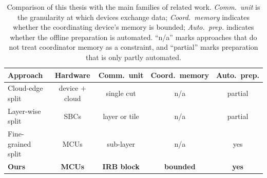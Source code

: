 \begin{table}[t]
\centering
\caption{Comparison of this thesis with the main families of related work.
\emph{Comm.\ unit} is the granularity at which devices exchange data;
\emph{Coord.\ memory} indicates whether the coordinating device's memory is bounded;
\emph{Auto.\ prep.} indicates whether the offline preparation is automated.
``n/a'' marks approaches that do not treat coordinator memory as a constraint, and ``partial'' marks preparation that is only partly automated.}
\label{tab:rw-positioning}
\footnotesize
\setlength{\tabcolsep}{5pt}
\begin{tabular}{l c c c c}
\hline
\textbf{Approach} & \textbf{Hardware} & \textbf{Comm.\ unit}
 & \textbf{Coord.\ memory} & \textbf{Auto.\ prep.} \\
\hline
Cloud-edge split & device $+$ cloud & single cut & n/a & partial \\
Layer-wise split & SBCs & layer or tile & n/a & partial \\
Fine-grained split & MCUs & sub-layer & n/a & yes \\
\textbf{Ours} & \textbf{MCUs} & \textbf{IRB block} & \textbf{bounded} &
\textbf{yes} \\
\hline
\end{tabular}
\end{table}